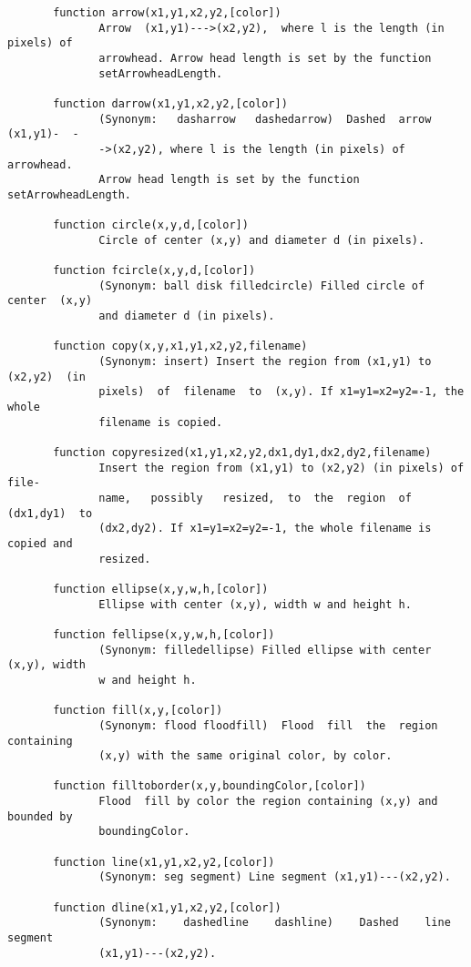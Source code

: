 \begin{codesize}
\begin{verbatim}
       function arrow(x1,y1,x2,y2,[color])
              Arrow  (x1,y1)--->(x2,y2),  where l is the length (in pixels) of
              arrowhead. Arrow head length is set by the function 
              setArrowheadLength.

       function darrow(x1,y1,x2,y2,[color])
              (Synonym:   dasharrow   dashedarrow)  Dashed  arrow  (x1,y1)-  -
              ->(x2,y2), where l is the length (in pixels) of arrowhead.
              Arrow head length is set by the function setArrowheadLength.

       function circle(x,y,d,[color])
              Circle of center (x,y) and diameter d (in pixels).

       function fcircle(x,y,d,[color])
              (Synonym: ball disk filledcircle) Filled circle of center  (x,y)
              and diameter d (in pixels).

       function copy(x,y,x1,y1,x2,y2,filename)
              (Synonym: insert) Insert the region from (x1,y1) to (x2,y2)  (in
              pixels)  of  filename  to  (x,y). If x1=y1=x2=y2=-1, the whole
              filename is copied.

       function copyresized(x1,y1,x2,y2,dx1,dy1,dx2,dy2,filename)
              Insert the region from (x1,y1) to (x2,y2) (in pixels) of  file‐
              name,   possibly   resized,  to  the  region  of  (dx1,dy1)  to
              (dx2,dy2). If x1=y1=x2=y2=-1, the whole filename is copied and
              resized.

       function ellipse(x,y,w,h,[color])
              Ellipse with center (x,y), width w and height h.

       function fellipse(x,y,w,h,[color])
              (Synonym: filledellipse) Filled ellipse with center (x,y), width
              w and height h.

       function fill(x,y,[color])
              (Synonym: flood floodfill)  Flood  fill  the  region  containing
              (x,y) with the same original color, by color.

       function filltoborder(x,y,boundingColor,[color])
              Flood  fill by color the region containing (x,y) and bounded by
              boundingColor.

       function line(x1,y1,x2,y2,[color])
              (Synonym: seg segment) Line segment (x1,y1)---(x2,y2).

       function dline(x1,y1,x2,y2,[color])
              (Synonym:    dashedline    dashline)    Dashed    line   segment
              (x1,y1)---(x2,y2).


\end{verbatim}
\end{codesize}
